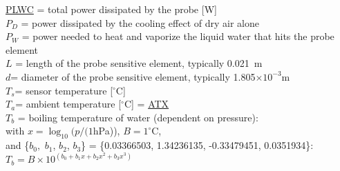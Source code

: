 \documentclass[
]{book}
\begin{document}
\protect\hyperlink{plwc}{PLWC} = total power dissipated by the probe {[}W{]}\\
\(P_{D}\) = power dissipated
by the cooling effect of dry air alone\\
\(P_{W}\) = power needed to heat and vaporize the liquid water that
hits the probe element\\
\(L\) = length
of the probe sensitive element,
typically 0.021~m\\
\(d\)= diameter of the probe sensitive
element, typically 1.805\(\times10^{-3}\)m\\
\(T_{s}\)= sensor temperature
{[}\(^{\circ}\)C{]}\\
\(T_{a}\)= ambient temperature {[}\(^{\circ}\)C{]} = \href{./4-the-state-of-the-atmosphere.html\#ambient-t}{ATX}\\
\(T_{b}\) =
boiling temperature of water (dependent on pressure):\\
\hspace*{0.333em}\hspace*{0.333em}\hspace*{0.333em}\hspace*{0.333em}\hspace*{0.333em}\hspace*{0.333em}\hspace*{0.333em}\hspace*{0.333em}\hspace*{0.333em}with \(x=\log_{10}(p/(1\)hPa)), \(B=1^{\circ}\)C,\\
\hspace*{0.333em}\hspace*{0.333em}\hspace*{0.333em}\hspace*{0.333em}\hspace*{0.333em}\hspace*{0.333em}\hspace*{0.333em}\hspace*{0.333em}\hspace*{0.333em}and \{\(b_{0},\) \(b_{1}\), \(b_{2}\), \(b_{3}\)\} = \{0.03366503, 1.34236135,
-0.33479451, 0.0351934\}:\\
\hspace*{0.333em}\hspace*{0.333em}\hspace*{0.333em}\hspace*{0.333em}\hspace*{0.333em}\hspace*{0.333em}\hspace*{0.333em}\hspace*{0.333em}\hspace*{0.333em}\hspace*{0.333em}\(T_{b}=B\times10^{(b_{0}+b_{1}x+b_{2}x^{2}+b_{3}x^{3})}\)\\
\end{document}
